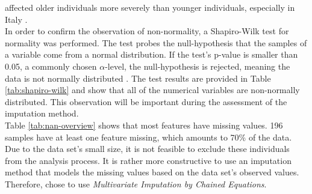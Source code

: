 affected older individuals more severely than younger individuals, especially 
in Italy \cite{RN193}. 
\\
In order to confirm the observation of non-normality, a Shapiro-Wilk test for 
normality was performed.
The test probes the null-hypothesis that the samples of a variable come from a 
normal distribution. If the test's p-value is smaller than 
0.05, a commonly chosen $\alpha$-level, the null-hypothesis is rejected, 
meaning the data is not normally distributed \cite{RN196}.
The test results are provided in Table \ref{tab:shapiro-wilk} and show 
that all of the numerical variables are non-normally distributed. This 
observation will be important during the assessment of the imputation method.
\\
Table \ref{tab:nan-overview} shows that most features have missing values. 196 
samples have at least one feature missing, which amounts to 70\% of the data. 
Due to the data set's small size, it is not feasible to exclude these 
individuals from the analysis process. It is rather more constructive to use an 
imputation method that models the missing values based on the data set's 
observed values. Therefore, \citeauthor{RN127} chose to use 
\textit{Multivariate 
Imputation by Chained Equations}. 

